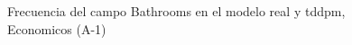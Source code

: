 \begin{figure}[H]
    \centering
    
    \caption{Frecuencia del campo Bathrooms en el modelo real y tddpm, Economicos (A-1)}
    \label{frecuency-Bathrooms-tddpm_mlp}
\end{figure}